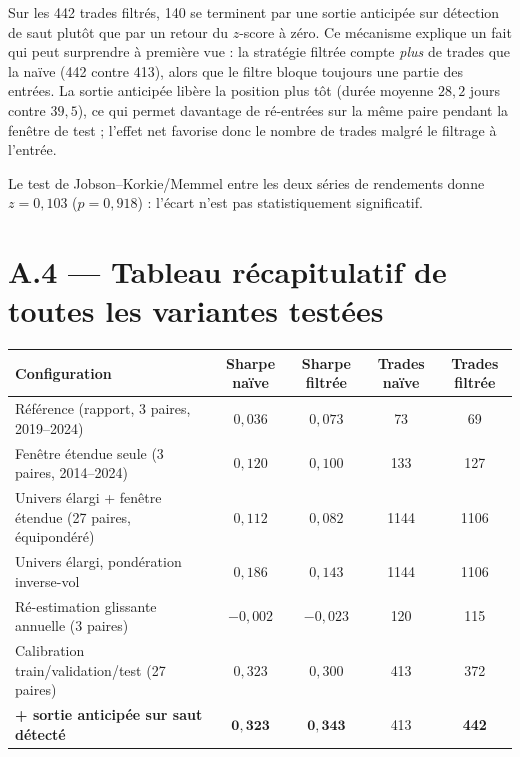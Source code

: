 \documentclass{article}
\begin{document}
Sur les 442 trades filtrés, 140 se terminent par une sortie anticipée sur détection de saut plutôt que par un retour du $z$-score à zéro. Ce mécanisme explique un fait qui peut surprendre à première vue : la stratégie filtrée compte \emph{plus} de trades que la naïve (442 contre 413), alors que le filtre bloque toujours une partie des entrées. La sortie anticipée libère la position plus tôt (durée moyenne $28{,}2$ jours contre $39{,}5$), ce qui permet davantage de ré-entrées sur la même paire pendant la fenêtre de test ; l'effet net favorise donc le nombre de trades malgré le filtrage à l'entrée.

Le test de Jobson--Korkie/Memmel entre les deux séries de rendements donne $z=0{,}103$ ($p=0{,}918$) : l'écart n'est pas statistiquement significatif.

\section*{A.4 --- Tableau récapitulatif de toutes les variantes testées}
\begin{center}
\begin{tabular}{lcccc}
\toprule
Configuration & Sharpe naïve & Sharpe filtrée & Trades naïve & Trades filtrée \\
\midrule
Référence (rapport, 3 paires, 2019--2024) & $0{,}036$ & $0{,}073$ & 73 & 69 \\
Fenêtre étendue seule (3 paires, 2014--2024) & $0{,}120$ & $0{,}100$ & 133 & 127 \\
Univers élargi + fenêtre étendue (27 paires, équipondéré) & $0{,}112$ & $0{,}082$ & 1144 & 1106 \\
Univers élargi, pondération inverse-vol & $0{,}186$ & $0{,}143$ & 1144 & 1106 \\
Ré-estimation glissante annuelle (3 paires) & $-0{,}002$ & $-0{,}023$ & 120 & 115 \\
Calibration train/validation/test (27 paires) & $0{,}323$ & $0{,}300$ & 413 & 372 \\
\textbf{+ sortie anticipée sur saut détecté} & $\mathbf{0{,}323}$ & $\mathbf{0{,}343}$ & 413 & \textbf{442} \\
\bottomrule
\end{tabular}
\end{center}
\end{document}
